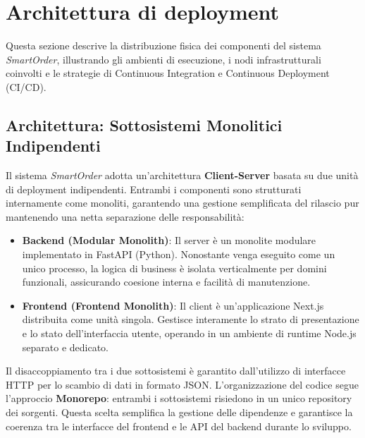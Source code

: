 \documentclass[a4paper, 11pt, oneside]{scrartcl}
\begin{document}
\section{Architettura di deployment}

Questa sezione descrive la distribuzione fisica dei componenti del sistema \textit{SmartOrder}, illustrando gli ambienti di esecuzione, i nodi
     infrastrutturali coinvolti e le strategie di Continuous Integration e Continuous Deployment (CI/CD).

\subsection{Architettura: Sottosistemi Monolitici Indipendenti}
Il sistema \textit{SmartOrder} adotta un'architettura \textbf{Client-Server} basata su due unità di deployment indipendenti. Entrambi i componenti
      sono strutturati internamente come monoliti, garantendo una gestione semplificata del rilascio pur mantenendo una netta separazione delle
      responsabilità:

\begin{itemize}
    \item \textbf{Backend (Modular Monolith)}: Il server è un monolite modulare implementato in FastAPI (Python). Nonostante venga eseguito come un
      unico processo, la logica di business è isolata verticalmente per domini funzionali, assicurando coesione interna e facilità di manutenzione.
    \item \textbf{Frontend (Frontend Monolith)}: Il client è un'applicazione Next.js distribuita come unità singola. Gestisce interamente lo strato
      di presentazione e lo stato dell'interfaccia utente, operando in un ambiente di runtime Node.js separato e dedicato.
\end{itemize}
Il disaccoppiamento tra i due sottosistemi è garantito dall'utilizzo di interfacce HTTP per lo scambio di dati in formato JSON.
L'organizzazione del codice segue l'approccio \textbf{Monorepo}: entrambi i sottosistemi risiedono in un unico repository dei sorgenti. Questa
scelta semplifica la gestione delle dipendenze e garantisce la coerenza tra le interfacce del frontend e le API del backend durante lo sviluppo.
\end{document}
